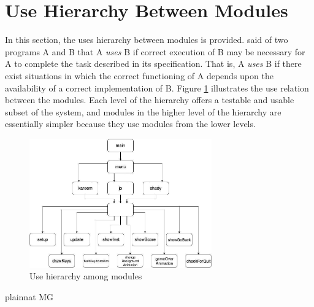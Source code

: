 \documentclass[12pt, titlepage]{article}
\begin{document}
\section{Use Hierarchy Between Modules} \label{SecUse}
In this section, the uses hierarchy between modules is
provided. \citet{Parnas1978} said of two programs A and B that A {\em uses} B if
correct execution of B may be necessary for A to complete the task described in
its specification. That is, A {\em uses} B if there exist situations in which
the correct functioning of A depends upon the availability of a correct
implementation of B.  Figure \ref{FigUH} illustrates the use relation between
the modules. Each level of the hierarchy offers a testable and usable subset of the
system, and modules in the higher level of the hierarchy are essentially simpler
because they use modules from the lower levels.
\begin{figure}[H]
\centering
\includegraphics[width=0.7\textwidth]{UsesHierarchy.png}
\caption{Use hierarchy among modules}
\label{FigUH}
\end{figure}

 {plainnat}
 {MG}
\end{document}
